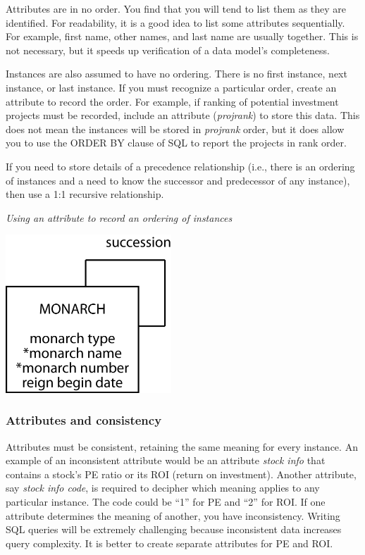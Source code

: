 \documentclass[
]{article}
\begin{document}
Attributes are in no order. You find that you will tend to list them as
they are identified. For readability, it is a good idea to list some
attributes sequentially. For example, first name, other names, and last
name are usually together. This is not necessary, but it speeds up
verification of a data model's completeness.

Instances are also assumed to have no ordering. There is no first
instance, next instance, or last instance. If you must recognize a
particular order, create an attribute to record the order. For example,
if ranking of potential investment projects must be recorded, include an
attribute (\emph{projrank}) to store this data. This does not mean the
instances will be stored in \emph{projrank} order, but it does allow you to
use the ORDER BY clause of SQL to report the projects in rank order.

If you need to store details of a precedence relationship (i.e., there
is an ordering of instances and a need to know the successor and
predecessor of any instance), then use a 1:1 recursive relationship.

\emph{Using an attribute to record an ordering of instances}

\includegraphics[width=2.44792in,height=\textheight]{Figures/Chapter 6/recursive-1-and-1.png}

\hypertarget{attributes-and-consistency}{%
\subsubsection*{Attributes and consistency}\label{attributes-and-consistency}}

Attributes must be consistent, retaining the same meaning for every
instance. An example of an inconsistent attribute would be an attribute
\emph{stock info} that contains a stock's PE ratio or its ROI (return on
investment). Another attribute, say \emph{stock info code}, is required to
decipher which meaning applies to any particular instance. The code
could be ``1'' for PE and ``2'' for ROI. If one attribute determines the
meaning of another, you have inconsistency. Writing SQL queries will be
extremely challenging because inconsistent data increases query
complexity. It is better to create separate attributes for PE and ROI.
\end{document}
